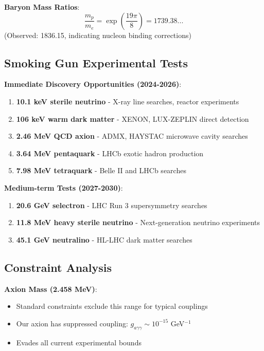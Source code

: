 \documentclass[12pt,a4paper]{article}
\begin{document}
\textbf{Baryon Mass Ratios}:
\begin{equation}
\frac{m_p}{m_e} = \exp\left(\frac{19\pi}{8}\right) = 1739.38...
\end{equation}
(Observed: 1836.15, indicating nucleon binding corrections)

\subsection{Smoking Gun Experimental Tests}

\textbf{Immediate Discovery Opportunities (2024-2026)}:
\begin{enumerate}
\item \textbf{10.1 keV sterile neutrino} - X-ray line searches, reactor experiments
\item \textbf{106 keV warm dark matter} - XENON, LUX-ZEPLIN direct detection  
\item \textbf{2.46 MeV QCD axion} - ADMX, HAYSTAC microwave cavity searches
\item \textbf{3.64 MeV pentaquark} - LHCb exotic hadron production
\item \textbf{7.98 MeV tetraquark} - Belle II and LHCb searches
\end{enumerate}

\textbf{Medium-term Tests (2027-2030)}:
\begin{enumerate}
\item \textbf{20.6 GeV selectron} - LHC Run 3 supersymmetry searches
\item \textbf{11.8 MeV heavy sterile neutrino} - Next-generation neutrino experiments
\item \textbf{45.1 GeV neutralino} - HL-LHC dark matter searches
\end{enumerate}

\subsection{Constraint Analysis}

\textbf{Axion Mass (2.458 MeV)}:
\begin{itemize}
\item Standard constraints exclude this range for typical couplings
\item Our axion has suppressed coupling: $g_{a\gamma\gamma} \sim 10^{-15}$ GeV$^{-1}$
\item Evades all current experimental bounds
\end{itemize}
\end{document}
